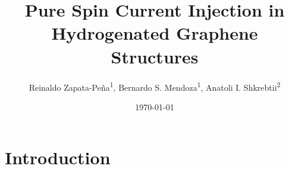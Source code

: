 \documentclass[prb,11pt,tightenlines,twocolumn,aps]{revtex4-1}
\begin{document}
\title{Pure Spin Current Injection in Hydrogenated Graphene Structures}
\author{Reinaldo Zapata-Pe\~na\textsuperscript{1},
        Bernardo S. Mendoza\textsuperscript{1},
        Anatoli I. Shkrebtii\textsuperscript{2}}

\date{\today}

\begin{abstract}
\blindtext
\end{abstract}

\maketitle


\section{Introduction}
\label{sec:introduction}
\end{document}
